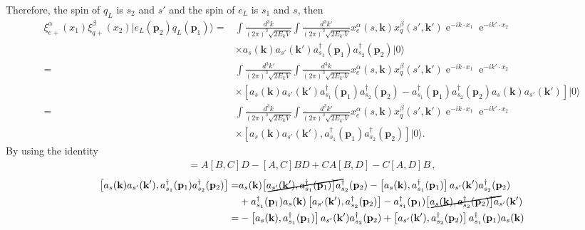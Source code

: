 Therefore, the spin of $q_L$ is $s_2$ and $s'$ and the spin of $e_L$ is $s_{1}$ and $s$, then %
\begin{align}
  \xi^\alpha_{e+}(x_1)\xi^\beta_{q+}(x_2)|e_L(\mathbf{p}_2)q_L(\mathbf{p}_1)\rangle=&
\int\frac{d^3k}{(2\pi)^3\sqrt{2E_k V}}\int\frac{d^3k'}{(2\pi)^3\sqrt{2E_{k'}V}}
x^\alpha_e(s,\mathbf{k})x^\beta_q(s',\mathbf{k}')\operatorname{e}^{-i k\cdot x_1}\operatorname{e}^{-i k'\cdot x_2}\nonumber\\
&\times a_s(\mathbf{k})a_{s'}(\mathbf{k}')a_{s_1}^\dagger(\mathbf{p}_1)a_{s_2}^\dagger(\mathbf{p}_2)|0\rangle \nonumber\\
=&
\int\frac{d^3k'}{(2\pi)^3\sqrt{2E_k V}}\int\frac{d^3k}{(2\pi)^3\sqrt{2E_{k'}V}}
x^\alpha_e(s,\mathbf{k})x^\beta_q(s',\mathbf{k}')\operatorname{e}^{-i k\cdot x_1}\operatorname{e}^{-i k'\cdot x_2}\nonumber\\
&\times \left[ a_s(\mathbf{k})a_{s'}(\mathbf{k}')a_{s_1}^\dagger(\mathbf{p}_1)a_{s_2}^\dagger(\mathbf{p}_2) - a_{s_1}^\dagger(\mathbf{p}_1)a_{s_2}^\dagger(\mathbf{p}_2) a_s(\mathbf{k})a_{s'}(\mathbf{k}') \right]|0\rangle \nonumber\\
=&
\int\frac{d^3k}{(2\pi)^3\sqrt{2E_k V}}\int\frac{d^3k'}{(2\pi)^3\sqrt{2E_{k'}V}}
x^\alpha_e(s,\mathbf{k})x^\beta_q(s',\mathbf{k}')\operatorname{e}^{-i k\cdot x_1}\operatorname{e}^{-i k'\cdot x_2}\nonumber\\
&\times \left[ a_s(\mathbf{k})a_{s'}(\mathbf{k}'),a_{s_1}^\dagger(\mathbf{p}_1)a_{s_2}^\dagger(\mathbf{p}_2)\right]|0\rangle.
\end{align}
By using the identity
\begin{align}
  [AB,CD]=A[B,C]D - [A,C]BD
+CA[B, D] - C[A, D]B\,,
\end{align}
\begin{align}
   \left[ a_s(\mathbf{k})a_{s'}(\mathbf{k}'),a_{s_1}^\dagger(\mathbf{p}_1)a_{s_2}^\dagger(\mathbf{p}_2)\right]=&
 a_s(\mathbf{k})\cancel{\left[ a_{s'}(\mathbf{k}'),a_{s_1}^\dagger(\mathbf{p}_1)\right]}a_{s_2}^\dagger(\mathbf{p}_2)
-
 \left[ a_s(\mathbf{k}),a_{s_1}^\dagger(\mathbf{p}_1)\right]a_{s'}(\mathbf{k}')a_{s_2}^\dagger(\mathbf{p}_2) \nonumber\\
& 
+a_{s_1}^\dagger(\mathbf{p}_1)a_s(\mathbf{k})\left[ a_{s'}(\mathbf{k}'),a_{s_2}^\dagger(\mathbf{p}_2)\right]
-
a_{s_1}^\dagger(\mathbf{p}_1) \cancel{\left[ a_s(\mathbf{k}),a_{s_2}^\dagger(\mathbf{p}_2)\right]}a_{s'}(\mathbf{k}') \nonumber\\
=&
-
 \left[ a_s(\mathbf{k}),a_{s_1}^\dagger(\mathbf{p}_1)\right]a_{s'}(\mathbf{k}')a_{s_2}^\dagger(\mathbf{p}_2)  
+\left[ a_{s'}(\mathbf{k}'),a_{s_2}^\dagger(\mathbf{p}_2)\right]a_{s_1}^\dagger(\mathbf{p}_1)a_s(\mathbf{k})
\end{align}

